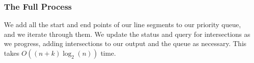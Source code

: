 \subsubsection{The Full Process}

We add all the start and end points of our line segments to our priority queue, 
and we iterate through them. We update the status and query for intersections as
we progress, adding intersections to our output and the queue as necessary.
This takes $O((n + k)\log_2(n))$ time.